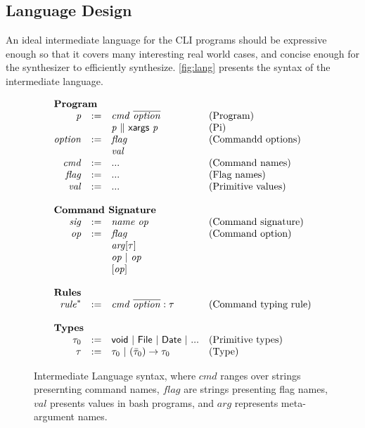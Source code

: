 \subsection{Language Design}
\label{subsec:represent}
An ideal intermediate language for the CLI programs should be expressive enough so that it covers many interesting real world cases, and concise enough for the synthesizer to efficiently synthesize. \autoref{fig:lang} presents the syntax of the intermediate language.

\begin{figure}[ht]
\[
\begin{array}{rlll}
\multicolumn{3}{l}{\textbf{Program}}\\
\mathit{p} & :=  & \mathit{cmd}~\overline{\mathit{option}} & \textrm{(Program)}\\
    &  & \mathit{p} ~\|~ \mathsf{xargs} ~\mathit{p} & \textrm{(Pi)} \\
\mathit{option} & := & \mathit{flag} & \textrm{(Commandd options)}\\
                &    & \mathit{val}\\
\mathit{cmd} & := & ... & \textrm{(Command names)}\\
\mathit{flag} & := & ... & \textrm{(Flag names)}\\
\mathit{val} & := & ...  & \textrm{(Primitive values)}\\
~\\
\multicolumn{3}{l}{\textbf{Command Signature}}\\
\mathit{sig} & := & \mathit{name}~\mathit{op} & \textrm{(Command signature)}\\
\mathit{op} &:= & \mathit{flag} & \textrm{(Command option)}\\
                &   & \mathit{arg}[\tau]\\
                &   & \mathit{op}~|~\mathit{op}\\
                &   & [ \mathit{op} ]\\
~\\
\multicolumn{3}{l}{\textbf{Rules}}\\
\mathit{rule}^{*} &:=& \mathit{cmd}~\overline{\mathit{option}} : \tau & \textrm{(Command typing rule)}\\
~\\
\multicolumn{3}{l}{\textbf{Types}}\\
\tau_0 & := & \mathsf{void} ~|~ \mathsf{File} ~|~ \mathsf{Date} ~|~ ...& \textrm{(Primitive types)}\\
\tau & := & \tau_0 ~|~ (\bar{\tau}_0)\rightarrow \tau_0 & \textrm{(Type)}
\end{array}
\]
\caption{Intermediate Language syntax, where $\mathit{cmd}$ ranges over strings presernting command names, $\mathit{flag}$ are strings presenting flag names, $\mathit{val}$ presents values in bash programs, and $\mathit{arg}$ represents meta-argument names.}
\label{fig:lang}
\end{figure}


